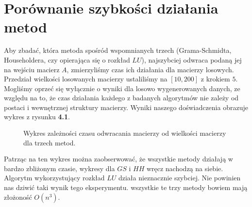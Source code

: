 \section{Porównanie szybkości działania metod}
Aby zbadać, która metoda spośród wspomnianych trzech (Grama-Schmidta, Householdera, czy
opierająca się o rozkład $LU$), najszybciej odwraca podaną jej na wejściu
macierz $A$, zmierzyliśmy czas ich działania dla macierzy losowych. Przedział
wielkości losowanych macierzy ustaliliśmy na $[10, 200]$ z krokiem $5$. Mogliśmy
oprzeć się wyłącznie o wyniki dla losowo wygenerowanych danych, ze względu na to,
że czas działania każdego z badanych algorytmów nie zależy od postaci i
wewnętrznej struktury macierzy. Wyniki naszego doświadczenia obrazuje wykres z
rysunku \textbf{4.1}.
\begin{figure}[h!tb]
\begin{center}

\caption{Wykres zależności czasu odwracania macierzy od wielkości macierzy dla trzech metod.}
\end{center}
\end{figure}

Patrząc na ten wykres można zaobserwować, że wszystkie metody działają w bardzo
zbliżonym czasie, wykresy dla $GS$ i $HH$ wręcz nachodzą na siebie. Algorytm
wykorzystujący rozkład $LU$ działa nieznacznie szybciej. Nie powinien nas dziwić
taki wynik tego eksperymentu. wszystkie te trzy metody bowiem mają złożoność
$O(n^3)$.
